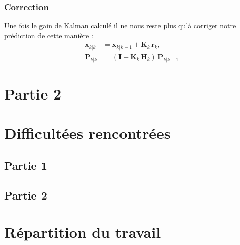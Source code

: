 \documentclass{article}
\begin{document}
\subsubsection{Correction}
Une fois le gain de Kalman calculé il ne nous reste plus qu'à corriger notre prédiction de cette manière :
\[
\begin{aligned}
    \mathbf x_{k|k} &= \mathbf x_{k|k-1} + \mathbf K_k \, \mathbf r_k, \\
    \mathbf P_{k|k} &= (\mathbf I - \mathbf K_k \, \mathbf H_k) \, \mathbf P_{k|k-1}
\end{aligned}
\]


\section{Partie 2}
\section{Difficultées rencontrées}
\subsection{Partie 1}
\subsection{Partie 2}
\section{Répartition du travail}
\end{document}
